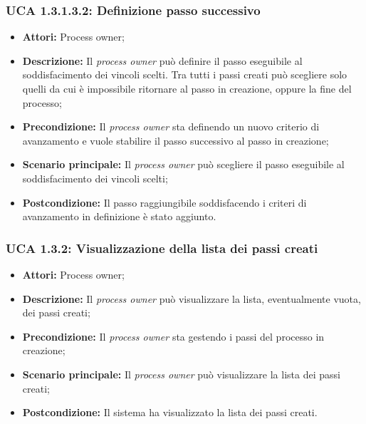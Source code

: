 \hypertarget{A1.3.1.3.2}{}
\subsubsection{UCA 1.3.1.3.2: Definizione passo successivo}
\begin{itemize}
\item \textbf{Attori:} Process owner;
\item \textbf{Descrizione:}
Il \textit{process owner} può definire il passo eseguibile al soddisfacimento dei vincoli scelti. Tra tutti i passi creati può scegliere solo quelli da cui è impossibile ritornare al passo in creazione, oppure la fine del processo;
\item \textbf{Precondizione:}
Il \textit{process owner} sta definendo un nuovo criterio di avanzamento e vuole stabilire il passo successivo al passo in creazione;
\item \textbf{Scenario principale:}
Il \textit{process owner} può scegliere il passo eseguibile al soddisfacimento dei vincoli scelti;
\item \textbf{Postcondizione:}
Il passo raggiungibile soddisfacendo i criteri di avanzamento in definizione è stato aggiunto.
\end{itemize}

\hypertarget{A1.3.2}{}
\subsubsection{UCA 1.3.2: Visualizzazione della lista dei passi creati}
\begin{itemize}
\item \textbf{Attori:} Process owner;
\item \textbf{Descrizione:}
Il \textit{process owner} può visualizzare la lista, eventualmente vuota, dei passi creati;
\item \textbf{Precondizione:}
Il \textit{process owner} sta gestendo i passi del processo in creazione;
\item \textbf{Scenario principale:}
Il \textit{process owner} può visualizzare la lista dei passi creati;
\item \textbf{Postcondizione:}
Il sistema ha visualizzato la lista dei passi creati.
\end{itemize}

\hypertarget{A1.3.3}{}
